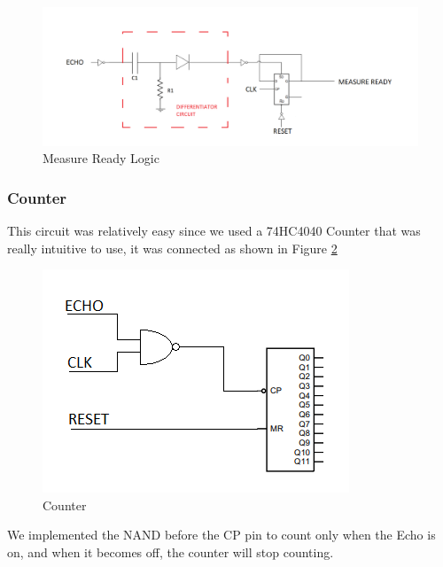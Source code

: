 \begin{figure}[h!]
\begin{centering}
\includegraphics[scale=0.5]{../Exercise8/Informe/images/MEASURE_READY}
\par\end{centering}
\caption{\color{cyan}Measure Ready Logic}

\label{8_6}
\end{figure}

\subsubsection{\color{red}Counter}

This circuit was relatively easy since we used a 74HC4040 Counter
that was really intuitive to use, it was connected as shown in Figure
\ref{8_7}

\begin{figure}[h!]
\begin{centering}
\includegraphics[scale=0.7]{../Exercise8/Informe/images/COUNTER}
\par\end{centering}
\caption{\color{cyan}Counter}
\label{8_7}

\end{figure}

We implemented the NAND before the CP pin to count only when the Echo
is on, and when it becomes off, the counter will stop counting.

